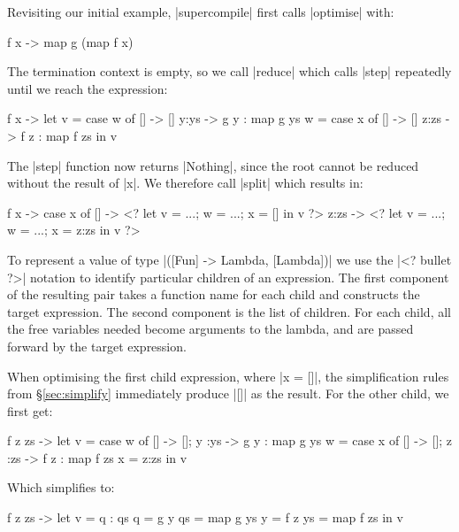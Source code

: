 \documentclass[draft]{sigplanconf}
\begin{document}
Revisiting our initial example, |supercompile| first calls |optimise| with:

\begin{code}
\g f x -> map g (map f x)
\end{code}

The termination context is empty, so we call |reduce| which calls |step| repeatedly until we reach the expression:

\begin{code}
\g f x ->  let  v = case  w of
                          [] -> []
                          y:ys -> g y : map g ys
                w = case  x of
                          [] -> []
                          z:zs -> f z : map f zs
           in   v
\end{code}

The |step| function now returns |Nothing|, since the root cannot be reduced without the result of |x|. We therefore call |split| which results in:

\begin{code}
\g f x -> case  x of
                []    -> <? let v = ...; w = ...; x = [] in v ?>
                z:zs  -> <? let v = ...; w = ...; x = z:zs in v ?>
\end{code}

To represent a value of type |([Fun] -> Lambda, [Lambda])| we use the |<? bullet ?>| notation to identify particular children of an expression. The first component of the resulting pair takes a function name for each child and constructs the target expression. The second component is the list of children. For each child, all the free variables needed become arguments to the lambda, and are passed forward by the target expression.

When optimising the first child expression, where |x = []|, the simplification rules from \S\ref{sec:simplify} immediately produce |[]| as the result. For the other child, we first get:

\begin{code}
\g f z zs ->
    let  v = case  w  of [] -> []; y  :ys  -> g  y  : map g  ys
         w = case  x  of [] -> []; z  :zs  -> f  z  : map f  zs
         x = z:zs
    in   v
\end{code}

Which simplifies to:

\begin{code}
\g f z zs ->  let  v = q : qs
                   q = g y
                   qs = map g ys
                   y = f z
                   ys = map f zs
              in   v
\end{code}
\end{document}
